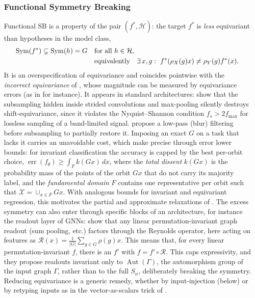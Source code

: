 \documentclass[mathematics,review,submit,moreauthors]{Definitions/mdpi}
\begin{document}
\subsubsection{Functional Symmetry Breaking}\label{sec:functional-sb}
Functional SB is a property of the pair $(f^*,\mathcal{H})$: the target $f^*$ is \emph{less} equivariant than hypotheses in the model class,
\begin{align}
\operatorname{Sym}(f^*)\subsetneq\operatorname{Sym}(h)=G\quad&\text{for all }h\in\mathcal{H},\\
&\text{equivalently}\quad \exists\,x,g:\ f^*(\rho_X(g)x)\neq\rho_Y(g)f^*(x).\notag
\end{align}
It is an overspecification of equivariance and coincides pointwise with the \emph{incorrect equivariance} of \citet{wang2023a}, whose magnitude can be measured by equivariance errors (as in  for instance).
It appears in standard architectures: \citet{zhang2019p3icml} show that the subsampling hidden inside strided convolutions and max-pooling silently destroys shift-equivariance, since it violates the Nyquist--Shannon condition $f_s>2f_{\max}$ for lossless sampling of a band-limited signal.
\citet{zhang2019p3icml} propose a low-pass (blur) filtering before subsampling to partially restore it.
Imposing an exact $G$ on a task that lacks it carries an unavoidable cost, which \citet{wang2023a} make precise through error lower bounds: for invariant classification the accuracy is capped by the best per-orbit choice, $\operatorname{err}(f_\theta)\ge\int_F k(Gx)\,dx$, where the \emph{total dissent} $k(Gx)$ is the probability mass of the points of the orbit $Gx$ that do not carry its majority label, and the \emph{fundamental domain} $F$ contains one representative per orbit such that $\mathcal{X}=\cup_{x\in F}Gx$.
With analogous bounds for invariant and equivariant regression, this motivates the partial and approximate relaxations of .
The excess symmetry can also enter through specific blocks of an architecture, for instance the readout layer of GNNs: \citet{talhi2026} show that any linear permutation-invariant graph readout (sum pooling, etc.) factors through the Reynolds operator, here acting on features as $\mathcal{R}(x)=\frac{1}{|G|}\sum_{g\in G}\rho(g)x$.
This means that, for every linear permutation-invariant $f$, there is an $f'$ with $f=f'\circ\mathcal{R}$.
This caps expressivity, and they propose readouts invariant only to $\operatorname{Aut}(\Gamma)$, the automorphism group of the input graph $\Gamma$, rather than to the full $S_n$, deliberately breaking the symmetry.
Reducing equivariance is a generic remedy, whether by input-injection (below) or by retyping inputs as in the vector-as-scalars trick of \citet{vadgama2025}.
\end{document}
